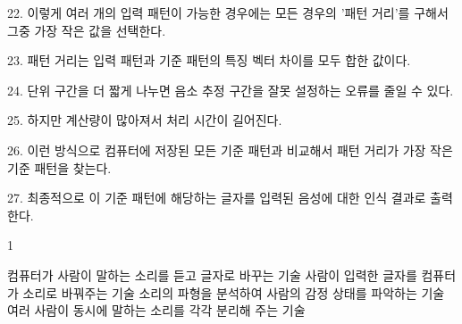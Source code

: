 \documentclass[fs9,seriesRus]{korfarm-base}
\begin{document}
{22. 이렇게 여러 개의 입력 패턴이 가능한 경우에는 모든 경우의 '패턴 거리'를 구해서 그중 가장 작은 값을 선택한다.

23. 패턴 거리는 입력 패턴과 기준 패턴의 특징 벡터 차이를 모두 합한 값이다.

24. 단위 구간을 더 짧게 나누면 음소 추정 구간을 잘못 설정하는 오류를 줄일 수 있다.

25. 하지만 계산량이 많아져서 처리 시간이 길어진다.

26. 이런 방식으로 컴퓨터에 저장된 모든 기준 패턴과 비교해서 패턴 거리가 가장 작은 기준 패턴을 찾는다.

27. 최종적으로 이 기준 패턴에 해당하는 글자를 입력된 음성에 대한 인식 결과로 출력한다.
}


\kfActivityBg \par{}\par\nopagebreak[4]\smallskip\nopagebreak[4]
\begin{kfVocab}
\end{kfVocab}

\kfActivityBg \par{}
\par{}\par\nopagebreak[4]\smallskip\nopagebreak[4]
\kfBeginMC
\begin{kfSentenceUnit}{1}{}
\begin{kfChoices}
\kfChoice 컴퓨터가 사람이 말하는 소리를 듣고 글자로 바꾸는 기술
\kfChoice 사람이 입력한 글자를 컴퓨터가 소리로 바꿔주는 기술
\kfChoice 소리의 파형을 분석하여 사람의 감정 상태를 파악하는 기술
\kfChoice 여러 사람이 동시에 말하는 소리를 각각 분리해 주는 기술
\end{kfChoices}
\end{kfSentenceUnit}
\end{document}
